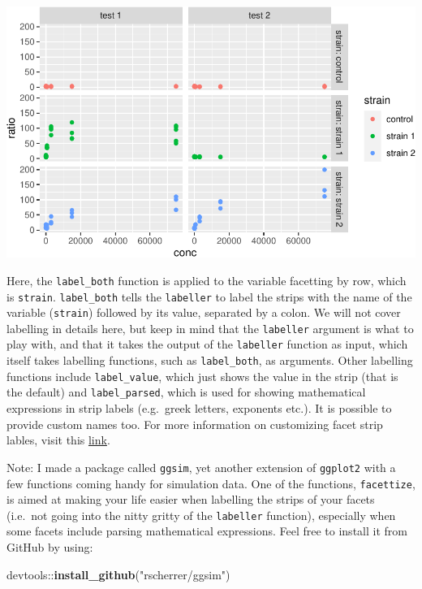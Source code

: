 \documentclass[]{book}
\newenvironment{Shaded}{}{}
\newcommand{\KeywordTok}[1]{\textcolor[rgb]{0.00,0.44,0.13}{\textbf{#1}}}
\newcommand{\NormalTok}[1]{#1}
\newcommand{\OperatorTok}[1]{\textcolor[rgb]{0.40,0.40,0.40}{#1}}
\newcommand{\StringTok}[1]{\textcolor[rgb]{0.25,0.44,0.63}{#1}}
\begin{document}
\begin{center}\includegraphics[width=\textwidth]{TRES-Tidy-Tutorial_files/figure-latex/unnamed-chunk-134-1} \end{center}

Here, the \texttt{label\_both} function is applied to the variable facetting by row, which is \texttt{strain}. \texttt{label\_both} tells the \texttt{labeller} to label the strips with the name of the variable (\texttt{strain}) followed by its value, separated by a colon. We will not cover labelling in details here, but keep in mind that the \texttt{labeller} argument is what to play with, and that it takes the output of the \texttt{labeller} function as input, which itself takes labelling functions, such as \texttt{label\_both}, as arguments. Other labelling functions include \texttt{label\_value}, which just shows the value in the strip (that is the default) and \texttt{label\_parsed}, which is used for showing mathematical expressions in strip labels (e.g.~greek letters, exponents etc.). It is possible to provide custom names too. For more information on customizing facet strip lables, visit this \href{https://www.datanovia.com/en/blog/how-to-change-ggplot-facet-labels/}{link}.

Note: I made a package called \texttt{ggsim}, yet another extension of \texttt{ggplot2} with a few functions coming handy for simulation data. One of the functions, \texttt{facettize}, is aimed at making your life easier when labelling the strips of your facets (i.e.~not going into the nitty gritty of the \texttt{labeller} function), especially when some facets include parsing mathematical expressions. Feel free to install it from GitHub by using:

\begin{Shaded}
\begin{Highlighting}[]
\NormalTok{devtools}\OperatorTok{::}\KeywordTok{install_github}\NormalTok{(}\StringTok{"rscherrer/ggsim"}\NormalTok{)}
\end{Highlighting}
\end{Shaded}
\end{document}
